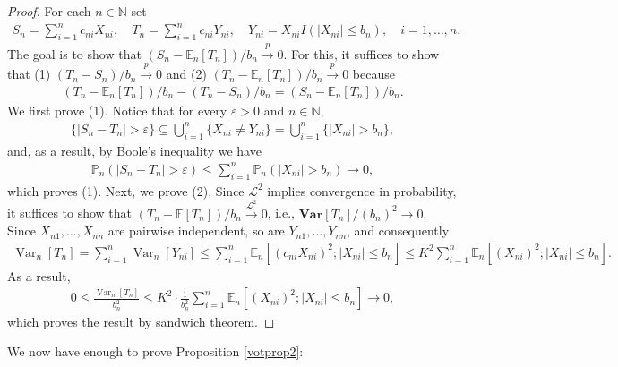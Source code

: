 \documentclass[11pt]{article}
\def\mc#1{\mathcal{#1}} %
\def\E{\mathbb{E}} %
\def\mc#1{\mathcal{#1}}
\def\var#1{\mathrm{Var}(#1)} %
\def\P{\mathbb{P}}
\def\var{\mathbf{Var}}
\def\naturals{\mathbb{N}}
\def\cp{\overset{p}{\to}}
\def\clt{\overset{\mathcal{L}^2}{\to}}
\DeclareMathOperator{\Var}{Var} %
\theoremstyle{definition}
\begin{document}
\begin{proof}
  For each $n\in \naturals$ set
    \begin{align*}
      S_n = \sum_{i=1}^n c_{ni} X_{ni}, \quad T_n = \sum_{i=1}^n c_{ni} Y_{ni},
      \quad Y_{ni} = X_{ni} I(|X_{ni}|\leq b_n), \quad i = 1, \ldots, n.
    \end{align*}
   The goal is to show that  $(S_n- \E_n[T_n])/b_n \cp 0$. For this, it suffices to show that (1) $(T_n - S_n)/b_n \cp 0$ and (2) $(T_n - \E_n[T_n])/b_n \cp 0$ because
    \begin{align*}
      (T_n - \E_n[T_n])/b_n -(T_n - S_n)/b_n = (S_n- \E_n[T_n])/b_n .
    \end{align*}
     We first prove (1). Notice that for every $\varepsilon > 0$ and $n\in \naturals$,
    \begin{align*}
      \{|S_n- T_n| > \varepsilon\}\subseteq \bigcup_{i=1}^n \{X_{ni}\neq Y_{ni}\}
      = \bigcup_{i=1}^n \{|X_{ni}|>b_n\},
    \end{align*}
    and, as a result, by Boole's inequality we have
    \begin{align*}
      \P_n (|S_n - T_n|>\varepsilon) \leq \sum_{i=1}^n \P_n(|X_{ni}|>b_n) \to 0,
    \end{align*}
    which proves (1). Next, we prove (2). Since $\mc{L}^2$ implies convergence in probability, it suffices to show that $(T_n-\E[T_n])/b_n \clt 0$, i.e., $\var[T_n]/(b_n)^2 \to 0$. Since $X_{n1}, \ldots, X_{nn}$ are pairwise independent, so are $Y_{n1}, \ldots, Y_{nn}$, and consequently
    \begin{align*}
      \Var_n[T_n]=\sum_{i=1}^n \Var_n[Y_{ni}] \leq \sum_{i=1}^n \E_n[(c_{ni}X_{ni})^2; |X_{ni}|\leq b_n] \leq K^2\sum_{i=1}^n \E_n[(X_{ni})^2; |X_{ni}|\leq b_n].
    \end{align*}
    As a result,
    \begin{align*}
    0\leq   \frac{\Var_n[T_n]}{b_n^2}\leq K^2 \cdot  \frac{1}{b_n^2}\sum_{i=1}^n \E_n[(X_{ni})^2; |X_{ni}|\leq b_n] \to 0,
    \end{align*}
    which proves the result by sandwich theorem.
\end{proof}

We now have enough to prove Proposition \ref{votprop2}:
\end{document}
